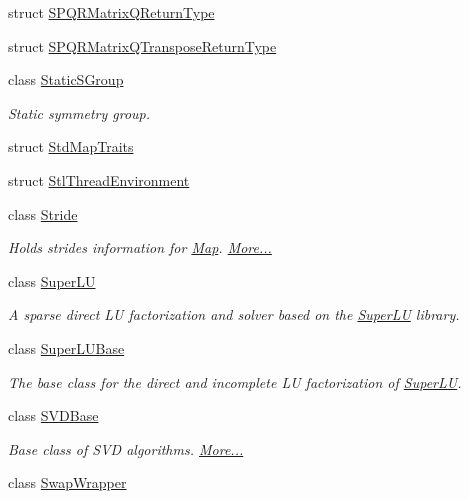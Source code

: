 \begin{DoxyCompactItemize}
struct \hyperlink{struct_eigen_1_1_s_p_q_r_matrix_q_return_type}{S\+P\+Q\+R\+Matrix\+Q\+Return\+Type}
\item 
struct \hyperlink{struct_eigen_1_1_s_p_q_r_matrix_q_transpose_return_type}{S\+P\+Q\+R\+Matrix\+Q\+Transpose\+Return\+Type}
\item 
class \hyperlink{class_eigen_1_1_static_s_group}{Static\+S\+Group}
\begin{DoxyCompactList}\small\item\em Static symmetry group. \end{DoxyCompactList}\item 
struct \hyperlink{struct_eigen_1_1_std_map_traits}{Std\+Map\+Traits}
\item 
struct \hyperlink{struct_eigen_1_1_stl_thread_environment}{Stl\+Thread\+Environment}
\item 
class \hyperlink{group___core___module_class_eigen_1_1_stride}{Stride}
\begin{DoxyCompactList}\small\item\em Holds strides information for \hyperlink{group___core___module_class_eigen_1_1_map}{Map}.  \hyperlink{group___core___module_class_eigen_1_1_stride}{More...}\end{DoxyCompactList}\item 
class \hyperlink{class_eigen_1_1_super_l_u}{Super\+LU}
\begin{DoxyCompactList}\small\item\em A sparse direct LU factorization and solver based on the \hyperlink{class_eigen_1_1_super_l_u}{Super\+LU} library. \end{DoxyCompactList}\item 
class \hyperlink{class_eigen_1_1_super_l_u_base}{Super\+L\+U\+Base}
\begin{DoxyCompactList}\small\item\em The base class for the direct and incomplete LU factorization of \hyperlink{class_eigen_1_1_super_l_u}{Super\+LU}. \end{DoxyCompactList}\item 
class \hyperlink{group___s_v_d___module_class_eigen_1_1_s_v_d_base}{S\+V\+D\+Base}
\begin{DoxyCompactList}\small\item\em Base class of S\+VD algorithms.  \hyperlink{group___s_v_d___module_class_eigen_1_1_s_v_d_base}{More...}\end{DoxyCompactList}\item 
class \hyperlink{class_eigen_1_1_swap_wrapper}{Swap\+Wrapper}

\end{DoxyCompactItemize}
